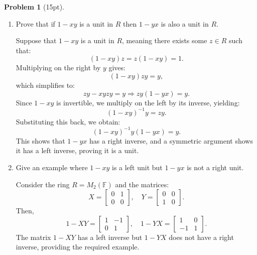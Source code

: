\documentclass[12pt]{article}
\theoremstyle{definition}
\newtheorem{problem}{Problem}
\begin{document}
\begin{problem}[15pt]
\begin{enumerate}[label=\arabic*.]
            \item Prove that if $1 - xy$ is a unit in $R$ then $1 - yx$ is also a unit in $R$.
            
            \begin{solution}
                  Suppose that $1 - xy$ is a unit in $R$, meaning there exists some $z \in R$ such that:
                  \[
                  (1 - xy)z = z(1 - xy) = 1.
                  \]
                  Multiplying on the right by $y$ gives:
                  \[
                  (1 - xy)z y = y,
                  \]
                  which simplifies to:
                  \[
                  z y - xy z y = y \Rightarrow z y (1 - yx) = y.
                  \]
                  Since $1 - xy$ is invertible, we multiply on the left by its inverse, yielding:
                  \[
                  (1 - xy)^{-1} y = z y.
                  \]
                  Substituting this back, we obtain:
                  \[
                  (1 - xy)^{-1} y (1 - yx) = y.
                  \]
                  This shows that $1 - yx$ has a right inverse, and a symmetric argument shows it has a left inverse, proving it is a unit.
            \end{solution}

            \item Give an example where $1 - xy$ is a left unit but $1 - yx$ is not a right unit.
            
            \begin{solution}
                  Consider the ring $R = M_2(\mathbb{F})$ and the matrices:
                  \[
                  X = \begin{bmatrix} 0 & 1 \\ 0 & 0 \end{bmatrix}, \quad Y = \begin{bmatrix} 0 & 0 \\ 1 & 0 \end{bmatrix}.
                  \]
                  Then,
                  \[
                  1 - XY = \begin{bmatrix} 1 & -1 \\ 0 & 1 \end{bmatrix}, \quad 1 - YX = \begin{bmatrix} 1 & 0 \\ -1 & 1 \end{bmatrix}.
                  \]
                  The matrix $1 - XY$ has a left inverse but $1 - YX$ does not have a right inverse, providing the required example.
            \end{solution}
      \end{enumerate}
\end{problem}
\end{document}
